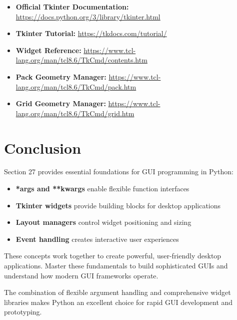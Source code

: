 \documentclass[12pt,a4paper]{article}
\begin{document}
\begin{itemize}
    \item \textbf{Official Tkinter Documentation:} \url{https://docs.python.org/3/library/tkinter.html}
    \item \textbf{Tkinter Tutorial:} \url{https://tkdocs.com/tutorial/}
    \item \textbf{Widget Reference:} \url{https://www.tcl-lang.org/man/tcl8.6/TkCmd/contents.htm}
    \item \textbf{Pack Geometry Manager:} \url{https://www.tcl-lang.org/man/tcl8.6/TkCmd/pack.htm}
    \item \textbf{Grid Geometry Manager:} \url{https://www.tcl-lang.org/man/tcl8.6/TkCmd/grid.htm}
\end{itemize}

\section{Conclusion}

Section 27 provides essential foundations for GUI programming in Python:

\begin{itemize}
    \item \textbf{*args and **kwargs} enable flexible function interfaces
    \item \textbf{Tkinter widgets} provide building blocks for desktop applications
    \item \textbf{Layout managers} control widget positioning and sizing
    \item \textbf{Event handling} creates interactive user experiences
\end{itemize}

These concepts work together to create powerful, user-friendly desktop applications. Master these fundamentals to build sophisticated GUIs and understand how modern GUI frameworks operate.

The combination of flexible argument handling and comprehensive widget libraries makes Python an excellent choice for rapid GUI development and prototyping.
\end{document}
